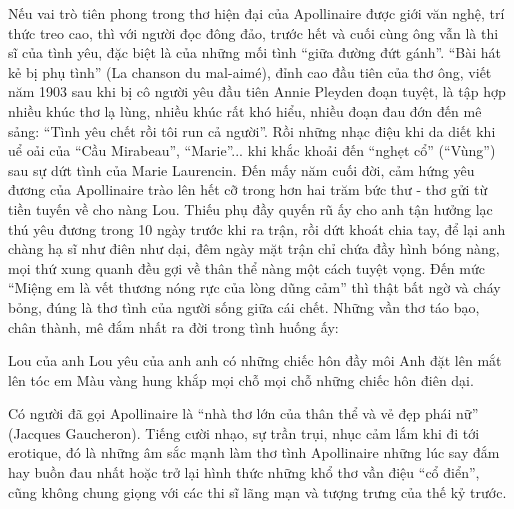 \documentclass[../main.tex]{subfiles}
\begin{document}
\begin{multicols}{2}
Nếu vai trò tiên phong trong thơ hiện đại của Apollinaire được giới văn nghệ, trí thức treo cao, thì với người đọc đông đảo, trước hết và cuối cùng ông vẫn là thi sĩ của tình yêu, đặc biệt là của những mối tình “giữa đường đứt gánh”. “Bài hát kẻ bị phụ tình” (La chanson du mal-aimé), đỉnh cao đầu tiên của thơ ông, viết năm 1903 sau khi bị cô người yêu đầu tiên Annie Pleyden đoạn tuyệt, là tập hợp nhiều khúc thơ lạ lùng, nhiều khúc rất khó hiểu, nhiều đoạn đau đớn đến mê sảng: “Tình yêu chết rồi tôi run cả người”. Rồi những nhạc điệu khi da diết khi uể oải của “Cầu Mirabeau”, “Marie”... khi khắc khoải đến “nghẹt cổ” (“Vùng”) sau sự dứt tình của Marie Laurencin. Đến mấy năm cuối đời, cảm hứng yêu đương của Apollinaire trào lên hết cỡ trong hơn hai trăm bức thư - thơ gửi từ tiền tuyến về cho nàng Lou. Thiếu phụ đầy quyến rũ ấy cho anh tận hưởng lạc thú yêu đương trong 10 ngày trước khi ra trận, rồi dứt khoát chia tay, để lại anh chàng hạ sĩ như điên như dại, đêm ngày mặt trận chỉ chứa đầy hình bóng nàng, mọi thứ xung quanh đều gợi về thân thể nàng một cách tuyệt vọng. Đến mức “Miệng em là vết thương nóng rực của lòng dũng cảm” thì thật bất ngờ và cháy bỏng, đúng là thơ tình của người sống giữa cái chết. Những vần thơ táo bạo, chân thành, mê đắm nhất ra đời trong tình huống ấy:  
\begin{blockquote}
        
Lou của anh Lou yêu của anh anh có những chiếc hôn đầy môi         
Anh đặt lên mắt lên tóc em         
Màu vàng hung khắp mọi chỗ mọi chỗ những chiếc hôn điên dại.  

\end{blockquote}
 
Có người đã gọi Apollinaire là “nhà thơ lớn của thân thể và vẻ đẹp phái nữ” (Jacques Gaucheron). Tiếng cười nhạo, sự trần trụi, nhục cảm lắm khi đi tới erotique, đó là những âm sắc mạnh làm thơ tình Apollinaire những lúc say đắm hay buồn đau nhất hoặc trở lại hình thức những khổ thơ vần điệu “cổ điển”, cũng không chung giọng với các thi sĩ lãng mạn và tượng trưng của thế kỷ trước. 
  
 


\end{multicols}
\end{document}
